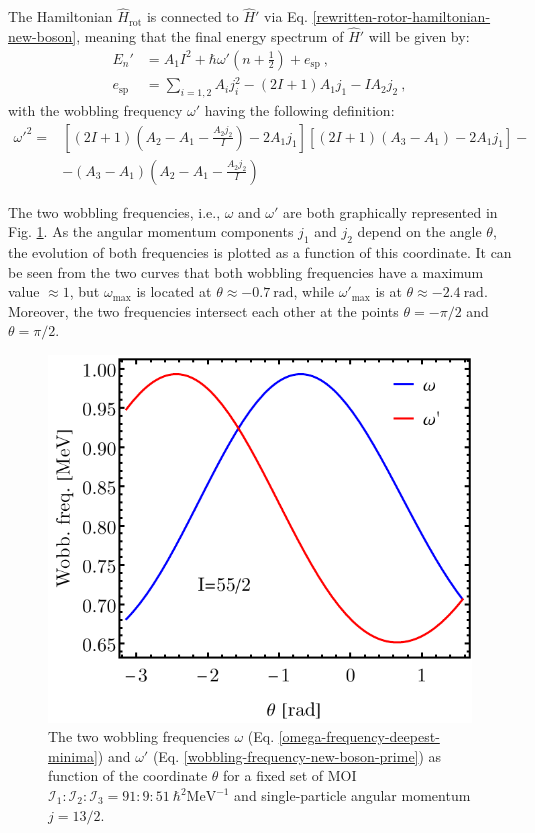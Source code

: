     The Hamiltonian $\hat{H}_\text{rot}$ is connected to $\hat{H}'$ via Eq. \ref{rewritten-rotor-hamiltonian-new-boson}, meaning that the final energy spectrum of $\hat{H}'$ will be given by:
    \begin{align}
        E_n'&=A_1I^2+\hbar\omega'\left(n+\frac{1}{2}\right)+e_\text{sp}\ ,\nonumber\\
        e_\text{sp}&=\sum_{i=1,2}A_ij_i^2-(2I+1)A_1j_1-IA_2j_2\ ,
        \label{energy-2nd-order-expansion-local-minima}
\end{align}
with the wobbling frequency $\omega'$ having the following definition:
\begin{align}
    \omega'^2=&\left[(2I+1)\left(A_2-A_1-\frac{A_2j_2}{I}\right)-2A_1j_1\right]\left[(2I+1)(A_3-A_1)-2A_1j_1\right]-\nonumber\\
    &-(A_3-A_1)\left(A_2-A_1-\frac{A_2j_2}{I}\right)
    \label{wobbling-frequency-new-boson-prime}
\end{align}

The two wobbling frequencies, i.e., $\omega$ and $\omega'$ are both graphically represented in Fig. \ref{wobbling-frequencies-harmonic-approx}. As the angular momentum components $j_1$ and $j_2$ depend on the angle $\theta$, the evolution of both frequencies is plotted as a function of this coordinate. It can be seen from the two curves that both wobbling frequencies have a maximum value $\approx1$, but $\omega_\text{max}$ is located at $\theta\approx-0.7\ \text{rad}$, while $\omega'_\text{max}$ is at $\theta\approx-2.4\ \text{rad}$. Moreover, the two frequencies intersect each other at the points $\theta=-\pi/2$ and $\theta=\pi/2$.
\begin{figure}
    \centering
    \includegraphics[scale=0.85]{Chapters/Figures/Wobbling-Frequencies-New-Boson.pdf}
    \caption{The two wobbling frequencies $\omega$ (Eq. \ref{omega-frequency-deepest-minima}) and $\omega'$ (Eq. \ref{wobbling-frequency-new-boson-prime}) as function of the coordinate $\theta$ for a fixed set of MOI $\mathcal{I}_1:\mathcal{I}_2:\mathcal{I}_3=91:9:51\ \hbar^2\text{MeV}^{-1}$ and single-particle angular momentum $j=13/2$.}
    \label{wobbling-frequencies-harmonic-approx}
\end{figure}

